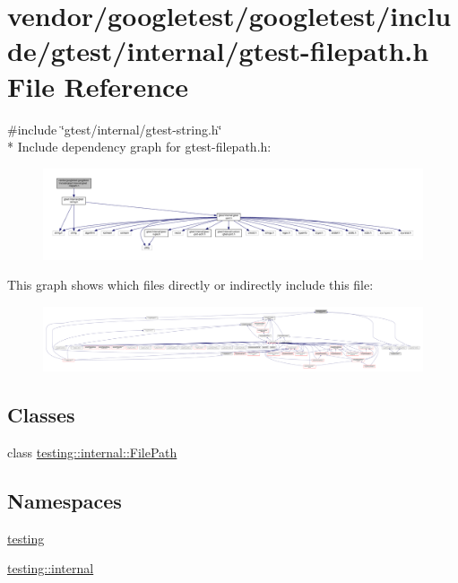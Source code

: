 \hypertarget{gtest-filepath_8h}{}\section{vendor/googletest/googletest/include/gtest/internal/gtest-\/filepath.h File Reference}
\label{gtest-filepath_8h}
{\ttfamily \#include \char`\"{}gtest/internal/gtest-\/string.\+h\char`\"{}}\\*
Include dependency graph for gtest-\/filepath.h\+:\nopagebreak
\begin{figure}[H]
\begin{center}
\leavevmode
\includegraphics[width=350pt]{gtest-filepath_8h__incl}
\end{center}
\end{figure}
This graph shows which files directly or indirectly include this file\+:\nopagebreak
\begin{figure}[H]
\begin{center}
\leavevmode
\includegraphics[width=350pt]{gtest-filepath_8h__dep__incl}
\end{center}
\end{figure}
\subsection*{Classes}
\begin{DoxyCompactItemize}
\item 
class \hyperlink{classtesting_1_1internal_1_1FilePath}{testing\+::internal\+::\+File\+Path}
\end{DoxyCompactItemize}
\subsection*{Namespaces}
\begin{DoxyCompactItemize}
\item 
 \hyperlink{namespacetesting}{testing}
\item 
 \hyperlink{namespacetesting_1_1internal}{testing\+::internal}
\end{DoxyCompactItemize}
